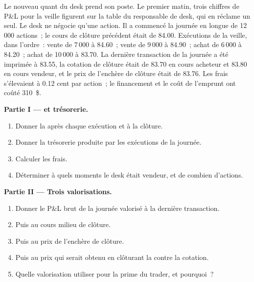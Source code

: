 \begin{problem}\label{pb:m1:pnl-and-positions:1}
Le nouveau quant du desk prend son poste. Le premier matin, trois chiffres de P\&L pour
la veille figurent sur la table du responsable de desk, qui en réclame un seul. Le desk
ne négocie qu'une action. Il a commencé la journée en  longue de 12\,000 actions~; le
cours de clôture précédent était de 84.00. Exécutions de la veille, dans l'ordre~: vente de 7\,000 à 84.60~; vente de 9\,000 à
84.90~; achat de 6\,000 à 84.20~; achat de 10\,000 à 83.70. La dernière transaction de la journée
a été imprimée à 83.55, la cotation de clôture était de 83.70 en cours acheteur et 83.80 en cours vendeur, et le
prix de l'enchère de clôture était de 83.76. Les frais s'élevaient à 0.12 cent par action~; le financement et le coût de
l'emprunt ont coûté 310~\$.

\medskip\noindent\textbf{Partie I ---  et trésorerie.}
\begin{enumerate}
\item Donner la  après chaque exécution et à la clôture.
\item Donner la trésorerie produite par les exécutions de la journée.
\item Calculer les frais.
\item Déterminer à quels moments le desk était vendeur, et de combien d'actions.
\end{enumerate}

\medskip\noindent\textbf{Partie II --- Trois valorisations.}
\begin{enumerate}[resume]
\item Donner le P\&L brut de la journée valorisé à la dernière transaction.
\item Puis au cours milieu de clôture.
\item Puis au prix de l'enchère de clôture.
\item Puis au prix qui serait obtenu en clôturant la  contre
la cotation.
\item Quelle valorisation utiliser pour la prime du trader, et pourquoi~?
\end{enumerate}


\end{problem}
